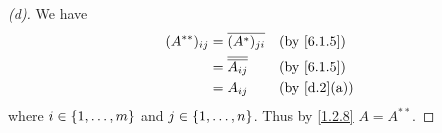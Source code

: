 \begin{proof}[(d)]
  We have
  \begin{align*}
    (A^{**})_{i j} & = \conj{(A^*)_{j i}}    &  & \text{(by \cref{6.1.5})}  \\
                   & = \conj{\conj{A_{i j}}} &  & \text{(by \cref{6.1.5})}  \\
                   & = A_{i j}               &  & \text{(by \cref{d.2}(a))}
  \end{align*}
  where \(i \in \left\lbrace1, \dots, m\right\rbrace\) and \(j \in \left\lbrace1, \dots, n\right\rbrace\).
  Thus by \cref{1.2.8} \(A = A^{**}\).
\end{proof}

\begin{ex}\label{ex:6.3.12}

\end{ex}

\begin{ex}\label{ex:6.3.19}

\end{ex}

\begin{ex}\label{ex:6.3.24}

\end{ex}
